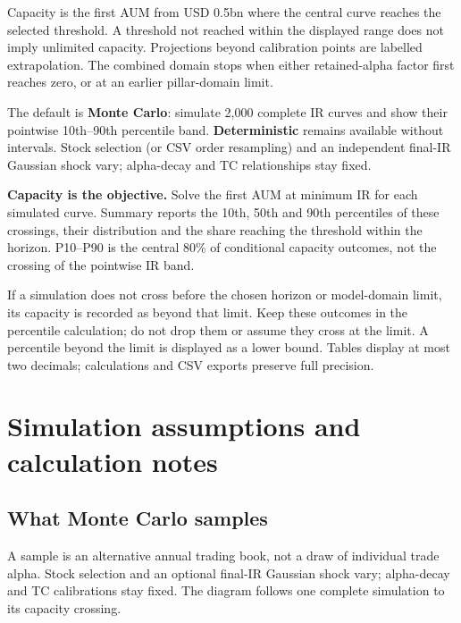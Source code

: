 \documentclass[11pt,a4paper]{article}
\begin{document}
Capacity is the first AUM from USD 0.5bn where the central curve reaches the selected threshold. A threshold not reached within the displayed range does not imply unlimited capacity. Projections beyond calibration points are labelled extrapolation. The combined domain stops when either retained-alpha factor first reaches zero, or at an earlier pillar-domain limit.

The default is \textbf{Monte Carlo}: simulate 2,000 complete IR curves and show their pointwise 10th--90th percentile band. \textbf{Deterministic} remains available without intervals. Stock selection (or CSV order resampling) and an independent final-IR Gaussian shock vary; alpha-decay and TC relationships stay fixed.

\textbf{Capacity is the objective.} Solve the first AUM at minimum IR for each simulated curve. Summary reports the 10th, 50th and 90th percentiles of these crossings, their distribution and the share reaching the threshold within the horizon. P10--P90 is the central 80\% of conditional capacity outcomes, not the crossing of the pointwise IR band.

If a simulation does not cross before the chosen horizon or model-domain limit, its capacity is recorded as beyond that limit. Keep these outcomes in the percentile calculation; do not drop them or assume they cross at the limit. A percentile beyond the limit is displayed as a lower bound. Tables display at most two decimals; calculations and CSV exports preserve full precision.

\newpage
\appendix
\section{Simulation assumptions and calculation notes}
\subsection{What Monte Carlo samples}
A sample is an alternative annual trading book, not a draw of individual trade alpha. Stock selection and an optional final-IR Gaussian shock vary; alpha-decay and TC calibrations stay fixed. The diagram follows one complete simulation to its capacity crossing.
\end{document}
